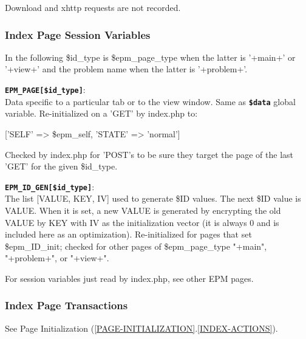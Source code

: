 \documentclass[12pt]{article}
\newenvironment{indpar}[1][0.4in]%
	{\begin{list}{}%
		     {\setlength{\itemsep}{0in}%
		      \setlength{\topsep}{0in}%
		      \setlength{\parsep}{1ex}%
		      \setlength{\labelwidth}{#1}%
		      \setlength{\leftmargin}{#1}%
		      \addtolength{\leftmargin}{\labelsep}}%
	 \item}%
	{\end{list}}
\newenvironment{itemlist}[1][0.2in]%
	{\begin{list}{}{\setlength{\labelwidth}{#1}%
		        \setlength{\leftmargin}{\labelwidth}%
		        \addtolength{\leftmargin}{+0.2in}%
		        \addtolength{\linewidth}{-\labelwidth}%
		        \addtolength{\linewidth}{-0.2in}%
		        \renewcommand{\makelabel}[1]{##1\hfill}}
	 \raggedright}%
	{\end{list}}
\newcommand{\TT}[1]{{\tt \bfseries #1}}
\newcommand{\sref}[2]{(\ref{#1}.\ref{#2})}
\begin{document}
\begin{indpar}
\begin{itemlist}
Download and xhttp requests are not recorded.


\end{itemlist}
\end{indpar}

\subsubsection{Index Page Session Variables}

\begin{indpar}[0.2in]
In the following \$id\_type is \$epm\_page\_type
when the latter is '+main+' or '+view+' and the problem
name when the latter is '+problem+'.
\begin{itemlist}
\item[\TT{EPM\_PAGE[\$id\_type]}:]~
\label{EPM_PAGE} \\
      Data specific to a particular tab or to the view
      window.  Same as \TT{\$data} global variable.
      Re-initialized on a 'GET' by index.php to:

      \centerline{ ['SELF' => \$epm\_self, 'STATE' => 'normal'] }

      Checked by index.php for 'POST's to be sure they target the
      page of the last 'GET' for the given \$id\_type.

\item[\TT{EPM\_ID\_GEN[\$id\_type]}:]~
\label{EPM_ID_GEN} \\
      The list [VALUE, KEY, IV] used to generate \$ID
      values.  The next \$ID value is VALUE.  When it
      is set, a new VALUE is generated by encrypting the
      old VALUE by KEY with IV as
      the initialization vector (it is always 0 and
      is included here as an optimization).
      Re-initialized for pages that set \$epm\_ID\_init;
      checked for other pages of \$epm\_page\_type
      "+main", "+problem+", or "+view+".


\end{itemlist}
\end{indpar}

For session variables just read by index.php, see other
EPM pages.

\subsubsection{Index Page Transactions}

See Page Initialization \sref{PAGE-INITIALIZATION}{INDEX-ACTIONS}.

\newpage
\end{document}
